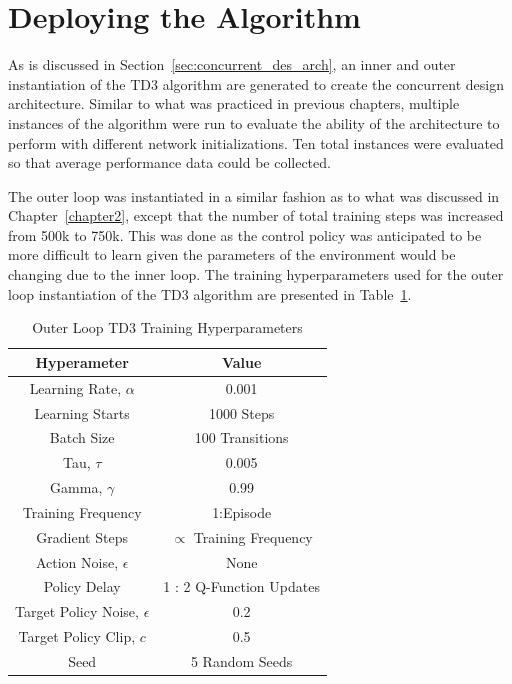 \section{Deploying the Algorithm}
As is discussed in Section~\ref{sec:concurrent_des_arch}, an inner and outer instantiation of the TD3 algorithm are generated to create the concurrent design architecture. Similar to what was practiced in previous chapters, multiple instances of the algorithm were run to evaluate the ability of the architecture to perform with different network initializations. Ten total instances were evaluated so that average performance data could be collected.

The outer loop was instantiated in a similar fashion as to what was discussed in Chapter~\ref{chapter2}, except that the number of total training steps was increased from 500k to 750k. This was done as the control policy was anticipated to be more difficult to learn given the parameters of the environment would be changing due to the inner loop. The training hyperparameters used for the outer loop instantiation of the TD3 algorithm are presented in Table~\ref{tab:conc_ctr_hyperparams}.

\begin{table}[tb!]
  \caption{Outer Loop TD3 Training Hyperparameters}
  \begin{center}
  \vspace{-12pt}
  \begin{tabular}{c c}
  \textbf{Hyperameter}            & \textbf{Value}                  \\
  \hline
  \hline
  Learning Rate, $\alpha$         & 0.001                           \\
  Learning Starts                 & 1000 Steps                      \\
  Batch Size                      & 100 Transitions                 \\
  Tau, $\tau$                     & 0.005                           \\
  Gamma, $\gamma$                 & 0.99                            \\
  Training Frequency              & 1:Episode                       \\
  Gradient Steps                  & $\propto$ Training Frequency    \\
  Action Noise,  $\epsilon$       & None                            \\
  Policy Delay                    & 1 : 2 Q-Function Updates        \\
  Target Policy Noise, $\epsilon$ & 0.2                             \\
  Target Policy Clip, $c$         & 0.5                             \\
  Seed                            & 5 Random Seeds                 \\
  \hline
  \hline
  \end{tabular}
  \label{tab:conc_ctr_hyperparams}
  \end{center}
\end{table}


